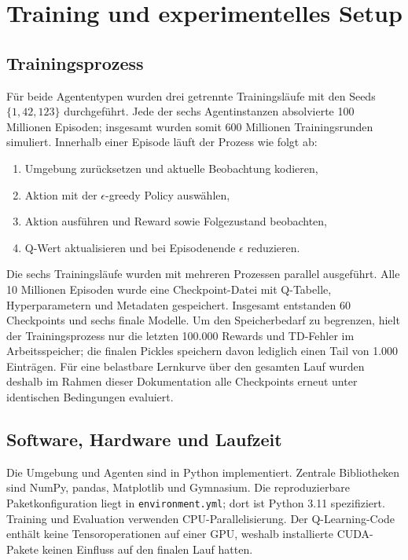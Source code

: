 \section{Training und experimentelles Setup}
\label{sec:setup}

\subsection{Trainingsprozess}

Für beide Agententypen wurden drei getrennte Trainingsläufe mit den
Seeds $\{1,42,123\}$ durchgeführt. Jede der sechs Agentinstanzen
absolvierte 100 Millionen Episoden; insgesamt wurden somit 600
Millionen Trainingsrunden simuliert. Innerhalb einer Episode läuft
der Prozess wie folgt ab:

\begin{enumerate}
  \item Umgebung zurücksetzen und aktuelle Beobachtung kodieren,
  \item Aktion mit der $\epsilon$-greedy Policy auswählen,
  \item Aktion ausführen und Reward sowie Folgezustand beobachten,
  \item Q-Wert aktualisieren und bei Episodenende $\epsilon$ reduzieren.
\end{enumerate}

Die sechs Trainingsläufe wurden mit mehreren Prozessen parallel
ausgeführt. Alle 10 Millionen Episoden wurde eine Checkpoint-Datei
mit Q-Tabelle, Hyperparametern und Metadaten gespeichert. Insgesamt
entstanden 60 Checkpoints und sechs finale Modelle. Um den
Speicherbedarf zu begrenzen, hielt der Trainingsprozess nur die
letzten 100.000 Rewards und TD-Fehler im Arbeitsspeicher; die finalen
Pickles speichern davon lediglich einen Tail von 1.000 Einträgen. Für
eine belastbare Lernkurve über den gesamten Lauf wurden deshalb im
Rahmen dieser Dokumentation alle Checkpoints erneut unter identischen
Bedingungen evaluiert.

\subsection{Software, Hardware und Laufzeit}

Die Umgebung und Agenten sind in Python implementiert. Zentrale
Bibliotheken sind NumPy, pandas, Matplotlib und Gymnasium. Die
reproduzierbare Paketkonfiguration liegt in \texttt{environment.yml};
dort ist Python 3.11 spezifiziert. Training und Evaluation verwenden
CPU-Parallelisierung. Der Q-Learning-Code enthält keine
Tensoroperationen auf einer GPU, weshalb installierte CUDA-Pakete
keinen Einfluss auf den finalen Lauf hatten.

